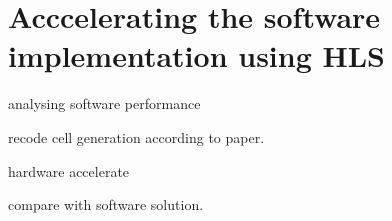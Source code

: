 
\chapter{Acccelerating the software implementation using HLS}


analysing software performance

recode cell generation according to paper.

hardware accelerate 

compare with software solution.